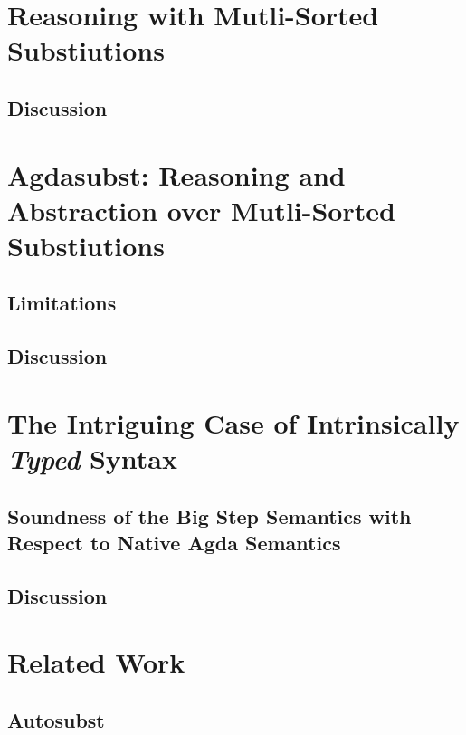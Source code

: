 \documentclass[screen,nonacm]{acmart}
\begin{document}
\section{Reasoning with Mutli-Sorted Substiutions}\label{sec:multi}

\subsection{Discussion}\label{sec:discussion-1}

\section{Agdasubst: Reasoning and Abstraction over Mutli-Sorted Substiutions}\label{sec:agdasubst}

\subsection{Limitations}\label{sec:limitations}

\subsection{Discussion}\label{sec:discussion-2}

\section{The Intriguing Case of Intrinsically \emph{Typed} Syntax}\label{sec:intrinsic}

\subsection{Soundness of the Big Step Semantics with Respect to Native Agda Semantics}\label{sec:soundness}

\subsection{Discussion}\label{sec:discussion-3}

\section{Related Work}\label{sec:related-work}

\subsection{Autosubst}\label{sec:autosubst}
\end{document}

